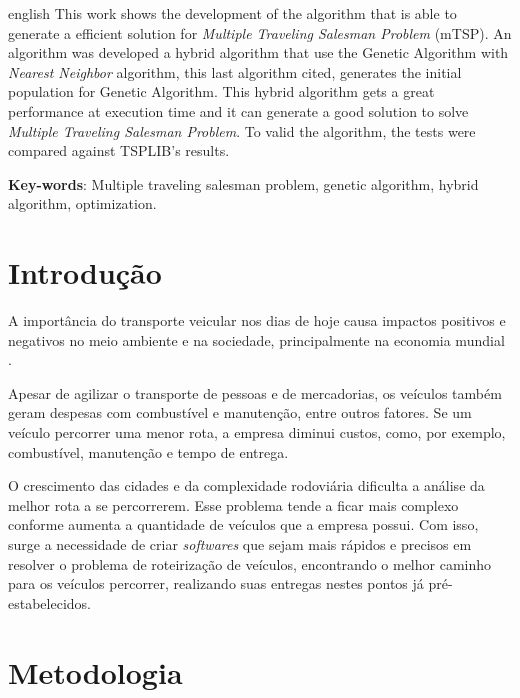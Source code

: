 \documentclass[12pt,openright,a4paper,oneside]{tcc}
\begin{document}
	\begin{resumo}[Abstract]
    	\begin{otherlanguage*}{english}
		This work shows the development of the algorithm that is able to generate a efficient solution for \textit{Multiple Traveling Salesman Problem} (mTSP). An algorithm was developed a hybrid algorithm that use the Genetic Algorithm with \textit{Nearest Neighbor} algorithm, this last algorithm cited, generates the initial population for Genetic Algorithm. This hybrid algorithm gets a great performance at execution time and it can generate a good solution to solve \textit{Multiple Traveling Salesman Problem}. To valid the algorithm, the tests were compared against TSPLIB's results.

        \vspace{\onelineskip}
        \noindent
        \textbf{Key-words}: Multiple traveling salesman problem, genetic algorithm,  hybrid algorithm, optimization.
		\end{otherlanguage*}
	\end{resumo}
	
    \textual
	\chapter{Introdução}
		
		A importância do transporte veicular nos dias de hoje causa impactos positivos e negativos 
	    no meio ambiente e na sociedade, principalmente na economia mundial \cite{meioAmbiente}. 
		
		Apesar de agilizar o transporte de pessoas e  de mercadorias, 
		os veículos também geram despesas com combustível e manutenção, entre outros fatores. 
		Se um veículo percorrer uma menor rota, a empresa diminui custos, como, por exemplo, 
		combustível, manutenção e tempo de entrega.

		O crescimento das cidades e da complexidade rodoviária dificulta a análise da melhor rota a se percorrerem. Esse problema tende a ficar mais complexo conforme aumenta a quantidade de veículos que a empresa possui. Com isso, surge a necessidade de criar 
		\textit{softwares} que sejam mais rápidos e precisos em resolver o problema de roteirização de veículos, encontrando o melhor caminho para os veículos percorrer, realizando suas entregas nestes pontos já pré-estabelecidos.


	\chapter{Metodologia}
\end{document}
